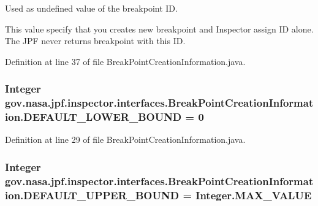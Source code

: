 Used as undefined value of the breakpoint ID. 

This value specify that you creates new breakpoint and Inspector assign ID alone. The J\+PF never returns breakpoint with this ID. 

Definition at line 37 of file Break\+Point\+Creation\+Information.\+java.

\subsubsection[{\texorpdfstring{D\+E\+F\+A\+U\+L\+T\+\_\+\+L\+O\+W\+E\+R\+\_\+\+B\+O\+U\+ND}{DEFAULT_LOWER_BOUND}}]{\setlength{\rightskip}{0pt plus 5cm}Integer gov.\+nasa.\+jpf.\+inspector.\+interfaces.\+Break\+Point\+Creation\+Information.\+D\+E\+F\+A\+U\+L\+T\+\_\+\+L\+O\+W\+E\+R\+\_\+\+B\+O\+U\+ND = 0\hspace{0.3cm}{\ttfamily [inherited]}}\hypertarget{interfacegov_1_1nasa_1_1jpf_1_1inspector_1_1interfaces_1_1_break_point_creation_information_a40131b93f82a84ed5322c4dc5ca4175e}{}\label{interfacegov_1_1nasa_1_1jpf_1_1inspector_1_1interfaces_1_1_break_point_creation_information_a40131b93f82a84ed5322c4dc5ca4175e}


Definition at line 29 of file Break\+Point\+Creation\+Information.\+java.

\subsubsection[{\texorpdfstring{D\+E\+F\+A\+U\+L\+T\+\_\+\+U\+P\+P\+E\+R\+\_\+\+B\+O\+U\+ND}{DEFAULT_UPPER_BOUND}}]{\setlength{\rightskip}{0pt plus 5cm}Integer gov.\+nasa.\+jpf.\+inspector.\+interfaces.\+Break\+Point\+Creation\+Information.\+D\+E\+F\+A\+U\+L\+T\+\_\+\+U\+P\+P\+E\+R\+\_\+\+B\+O\+U\+ND = Integer.\+M\+A\+X\+\_\+\+V\+A\+L\+UE\hspace{0.3cm}{\ttfamily [inherited]}}\hypertarget{interfacegov_1_1nasa_1_1jpf_1_1inspector_1_1interfaces_1_1_break_point_creation_information_af917e7de77b2a6fc93c24e1c5a4a5759}{}\label{interfacegov_1_1nasa_1_1jpf_1_1inspector_1_1interfaces_1_1_break_point_creation_information_af917e7de77b2a6fc93c24e1c5a4a5759}


